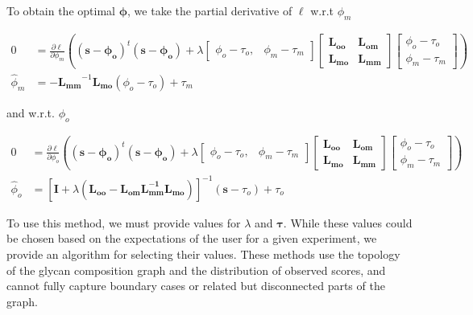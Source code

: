         To obtain the optimal $\mathbf{\phi}$, we take the partial
        derivative of $\ell$ w.r.t $\phi_m$

        \begin{align}
            0 &= \frac{\partial\ell}{\partial\phi_m}\left((\mathbf{s} - \mathbf{\phi_o})^t(\mathbf{s} - \mathbf{\phi_o}) + \lambda
                \begin{bmatrix}
                    \phi_o - \tau_o, & \phi_m - \tau_m
                \end{bmatrix}
                \begin{bmatrix}
                    \mathbf{L_{oo}} & \mathbf{L_{om}} \\ \mathbf{L_{mo}} & \mathbf{L_{mm}}
                \end{bmatrix}
                \begin{bmatrix}
                    \phi_o - \tau_o \\ \phi_m - \tau_m
                \end{bmatrix}\right)\\
            {\hat \phi_m} &= -\mathbf{L_{mm}}^{-1}\mathbf{L_{mo}}(\phi_o - \tau_o) + \tau_m
            \label{eqn:estimate_of_phi_m}
        \end{align}

        \noindent and w.r.t. $\phi_o$

        \begin{align}
            0 &= \frac{\partial\ell}{\partial\phi_o}\left((\mathbf{s} - \mathbf{\phi_o}
                )^t(\mathbf{s} - \mathbf{\phi_o}) + \lambda
                \begin{bmatrix}
                    \phi_o - \tau_o, & \phi_m - \tau_m
                \end{bmatrix}
                \begin{bmatrix}
                    \mathbf{L_{oo}} & \mathbf{L_{om}} \\ \mathbf{L_{mo}} & \mathbf{L_{mm}}
                \end{bmatrix}
                \begin{bmatrix}
                    \phi_o - \tau_o \\ \phi_m - \tau_m
                \end{bmatrix}\right)\\
            {\hat \phi_o} &= \left[
                \mathbf{I} + \lambda\left(\mathbf{L_{oo}} -
                    \mathbf{L_{om}}\mathbf{L_{mm}^{-1}}\mathbf{L_{mo}}
                \right)
            \right]^{-1}(\mathbf{s} - \tau_o) + \tau_o
            \label{eqn:estimate_of_phi_o}
        \end{align}

        To use this method, we must provide values for $\lambda$ and $\mathbf{\tau}$.
        While these values could be chosen based on the expectations of the user for
        a given experiment, we provide an algorithm for selecting their values.
        These methods use the topology of the glycan composition graph and the
        distribution of observed scores, and cannot fully capture boundary cases
        or related but disconnected parts of the graph.
